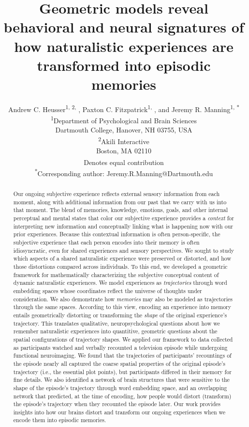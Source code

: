 \documentclass{article}
\title{Geometric models reveal behavioral and neural signatures of how naturalistic experiences are transformed into episodic memories}
\author{Andrew C. Heusser\textsuperscript{1, 2, \textdagger}, Paxton C. Fitzpatrick\textsuperscript{1, \textdagger}, and Jeremy R. Manning\textsuperscript{1, *}\\\textsuperscript{1}Department of Psychological and Brain Sciences\\Dartmouth College, Hanover, NH 03755, USA\\\textsuperscript{2}Akili Interactive\\Boston, MA 02110\\\textsuperscript{\textdagger}Denotes equal contribution\\\textsuperscript{*}Corresponding author: Jeremy.R.Manning@Dartmouth.edu}
\begin{document}
\maketitle

\begin{abstract}
Our ongoing subjective experience reflects external sensory information from each moment, along with additional information from our past that we carry with us into that moment.  The blend of memories, knowledge, emotions, goals, and other internal perceptual and mental states that color our subjective experience provides a \textit{context} for interpreting new information and conceptually linking what is happening now with our prior experiences.  Because this contextual information is often person-specific, the subjective experience that each person encodes into their memory is often idiosyncratic, even for shared experiences and sensory perspectives.  We sought to study which aspects of a shared naturalistic experience were preserved or distorted, and how those distortions compared across individuals.  To this end, we developed a geometric framework for mathematically characterizing the subjective conceptual content of dynamic naturalistic experiences.  We model experiences as \textit{trajectories} through word embedding spaces whose coordinates reflect the universe of thoughts under consideration.  We also demonstrate how \textit{memories} may also be modeled as trajectories through the same spaces.  According to this view, encoding an experience into memory entails geometrically distorting or transforming the \textit{shape} of the original experience's trajectory.  This translates qualitative, neuropsychological questions about how we remember naturalistic experiences into quantitive, geometric questions about the spatial configurations of trajectory shapes.  We applied our framework to data collected as participants watched and verbally recounted a television episode while undergoing functional neuroimaging.  We found that the trajectories of participants' recountings of the episode nearly all captured the coarse spatial properties of the original episode's trajectory (i.e., the essential plot points), but participants differed in their memory for fine details.  We also identified a network of brain structures that were sensitive to the shape of the episode's trajectory through word embedding space, and an overlapping network that predicted, at the time of encoding, how people would distort (transform) the episode's trajectory when they recounted the episode later.  Our work provides insights into how our brains distort and transform our ongoing experiences when we encode them into episodic memories.
\end{abstract}
\end{document}
